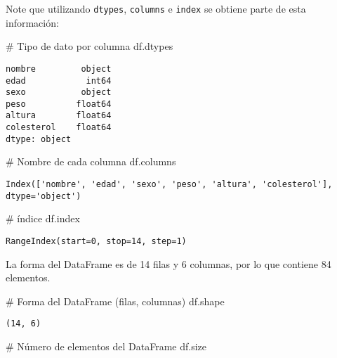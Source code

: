 \documentclass[
  letterpaper,
  DIV=11,
  numbers=noendperiod]{scrreprt}
\newenvironment{Shaded}{\begin{snugshade}}{\end{snugshade}}
\newcommand{\CommentTok}[1]{\textcolor[rgb]{0.37,0.37,0.37}{#1}}
\newcommand{\NormalTok}[1]{\textcolor[rgb]{0.00,0.23,0.31}{#1}}
\begin{document}
Note que utilizando \texttt{dtypes}, \texttt{columns} e \texttt{index}
se obtiene parte de esta información:

\begin{Shaded}
\begin{Highlighting}[]
\CommentTok{\# Tipo de dato por columna}
\NormalTok{df.dtypes}
\end{Highlighting}
\end{Shaded}

\begin{verbatim}
nombre         object
edad            int64
sexo           object
peso          float64
altura        float64
colesterol    float64
dtype: object
\end{verbatim}

\begin{Shaded}
\begin{Highlighting}[]
\CommentTok{\# Nombre de cada columna}
\NormalTok{df.columns}
\end{Highlighting}
\end{Shaded}

\begin{verbatim}
Index(['nombre', 'edad', 'sexo', 'peso', 'altura', 'colesterol'], dtype='object')
\end{verbatim}

\begin{Shaded}
\begin{Highlighting}[]
\CommentTok{\# índice}
\NormalTok{df.index}
\end{Highlighting}
\end{Shaded}

\begin{verbatim}
RangeIndex(start=0, stop=14, step=1)
\end{verbatim}

La forma del DataFrame es de 14 filas y 6 columnas, por lo que contiene
84 elementos.

\begin{Shaded}
\begin{Highlighting}[]
\CommentTok{\# Forma del DataFrame (filas, columnas)}
\NormalTok{df.shape}
\end{Highlighting}
\end{Shaded}

\begin{verbatim}
(14, 6)
\end{verbatim}

\begin{Shaded}
\begin{Highlighting}[]
\CommentTok{\# Número de elementos del DataFrame}
\NormalTok{df.size}
\end{Highlighting}
\end{Shaded}
\end{document}
